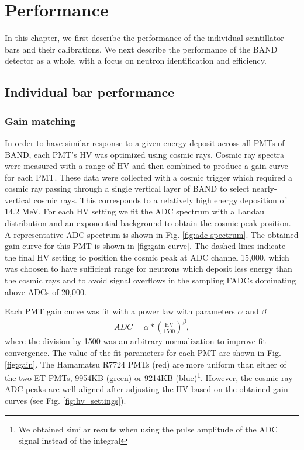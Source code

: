 \documentclass[3p,final,twocolumn]{elsarticle}
\begin{document}
\section{Performance}
In this chapter, we first describe the performance of the individual scintillator bars and their calibrations. We next describe the performance
of the BAND detector as a whole, with a focus on neutron identification and efficiency.

\subsection{Individual bar performance}
\subsubsection{Gain matching}
In order to have similar response to a given energy deposit across all PMTs of BAND, each PMT's HV was optimized using cosmic rays. Cosmic
ray spectra were measured with a range of HV and then combined to produce a gain curve for each PMT. These data were
collected with a cosmic trigger which required a cosmic ray passing through a single vertical layer of BAND to select nearly-vertical
cosmic rays. This corresponds to a relatively high energy deposition of 14.2 \si{\mega\eV}. For each HV setting we fit the ADC spectrum
with a Landau distribution and an exponential background to obtain the cosmic peak position. A representative ADC spectrum is shown in
Fig. \ref{fig:adc-spectrum}.  The obtained gain curve for this PMT is shown in \ref{fig:gain-curve}. The dashed lines indicate the final HV
setting to position the cosmic peak at ADC channel 15,000, which was choosen to have sufficient range for neutrons which deposit less
energy than the cosmic rays and to avoid signal overflows in the sampling FADCs dominating above ADCs of 20,000.

Each PMT gain curve was fit with a power law with parameters $\alpha$ and $\beta$
\begin{eqnarray}
	ADC	= \alpha * \left(\frac{\mathrm{HV}}{1500}\right)^{\beta},				
		\label{eqn:gain_curve}
\end{eqnarray}
where the division by 1500 was an arbitrary normalization to improve fit convergence. The value of the fit parameters for each PMT are
shown in Fig. \ref{fig:gain}. The Hamamatsu R7724 PMTs (red) are more uniform than either of the two ET PMTs, 9954KB (green) or
9214KB (blue)\footnote{We obtained similar results when using the pulse amplitude of the ADC signal instead of the integral}. 
However, the cosmic ray ADC peaks are well aligned after adjusting the HV based on the obtained gain curves (see Fig. \ref{fig:hv_settings}).
\end{document}
